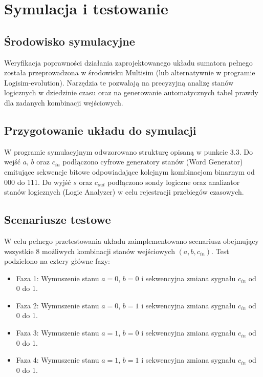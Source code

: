 %   

\section{Symulacja i testowanie}

\subsection{Środowisko symulacyjne}

Weryfikacja poprawności działania zaprojektowanego układu sumatora pełnego została przeprowadzona w środowisku Multisim (lub alternatywnie w programie Logisim-evolution). Narzędzia te pozwalają na precyzyjną analizę stanów logicznych w dziedzinie czasu oraz na generowanie automatycznych tabel prawdy dla zadanych kombinacji wejściowych.

\subsection{Przygotowanie układu do symulacji}

W programie symulacyjnym odwzorowano strukturę opisaną w punkcie 3.3. Do wejść $a$, $b$ oraz $c_{in}$ podłączono cyfrowe generatory stanów (Word Generator) emitujące sekwencje bitowe odpowiadające kolejnym kombinacjom binarnym od 000 do 111. Do wyjść $s$ oraz $c_{out}$ podłączono sondy logiczne oraz analizator stanów logicznych (Logic Analyzer) w celu rejestracji przebiegów czasowych.

\subsection{Scenariusze testowe}

W celu pełnego przetestowania układu zaimplementowano scenariusz obejmujący wszystkie 8 możliwych kombinacji stanów wejściowych $(a, b, c_{in})$. Test podzielono na cztery główne fazy:

\begin{itemize}
    \item Faza 1: Wymuszenie stanu $a = 0$, $b = 0$ i sekwencyjna zmiana sygnału $c_{in}$ od 0 do 1.
    \item Faza 2: Wymuszenie stanu $a = 0$, $b = 1$ i sekwencyjna zmiana sygnału $c_{in}$ od 0 do 1.
    \item Faza 3: Wymuszenie stanu $a = 1$, $b = 0$ i sekwencyjna zmiana sygnału $c_{in}$ od 0 do 1.
    \item Faza 4: Wymuszenie stanu $a = 1$, $b = 1$ i sekwencyjna zmiana sygnału $c_{in}$ od 0 do 1.
\end{itemize}

